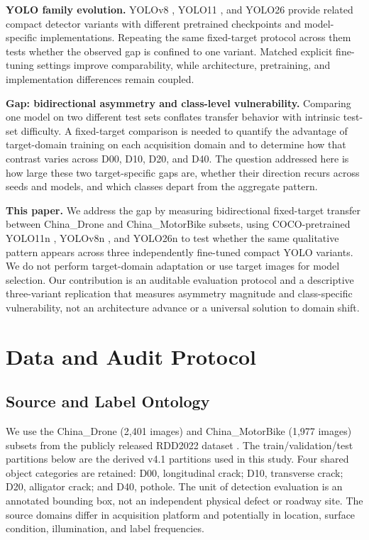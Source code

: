 \documentclass[conference,a4paper]{IEEEtran}
\begin{document}
\textbf{YOLO family evolution.} YOLOv8 \cite{ultralyticsyolov8}, YOLO11 \cite{jocher2024yolo11}, and YOLO26 \cite{ultralyticsyolo26} provide related compact detector variants with different pretrained checkpoints and model-specific implementations. Repeating the same fixed-target protocol across them tests whether the observed gap is confined to one variant. Matched explicit fine-tuning settings improve comparability, while architecture, pretraining, and implementation differences remain coupled.

\textbf{Gap: bidirectional asymmetry and class-level vulnerability.} Comparing one model on two different test sets conflates transfer behavior with intrinsic test-set difficulty. A fixed-target comparison is needed to quantify the advantage of target-domain training on each acquisition domain and to determine how that contrast varies across D00, D10, D20, and D40. The question addressed here is how large these two target-specific gaps are, whether their direction recurs across seeds and models, and which classes depart from the aggregate pattern.

\textbf{This paper.} We address the gap by measuring bidirectional fixed-target transfer between China\_Drone and China\_MotorBike subsets, using COCO-pretrained \cite{lin2014coco} YOLO11n \cite{jocher2024yolo11}, YOLOv8n \cite{ultralyticsyolov8}, and YOLO26n \cite{ultralyticsyolo26} to test whether the same qualitative pattern appears across three independently fine-tuned compact YOLO variants. We do not perform target-domain adaptation or use target images for model selection. Our contribution is an auditable evaluation protocol and a descriptive three-variant replication that measures asymmetry magnitude and class-specific vulnerability, not an architecture advance or a universal solution to domain shift.

\section{Data and Audit Protocol}
\subsection{Source and Label Ontology}
We use the China\_Drone (2,401 images) and China\_MotorBike (1,977 images) subsets from the publicly released RDD2022 dataset \cite{arya2024rdd2022}. The train/validation/test partitions below are the derived v4.1 partitions used in this study. Four shared object categories are retained: D00, longitudinal crack; D10, transverse crack; D20, alligator crack; and D40, pothole. The unit of detection evaluation is an annotated bounding box, not an independent physical defect or roadway site. The source domains differ in acquisition platform and potentially in location, surface condition, illumination, and label frequencies.
\end{document}
